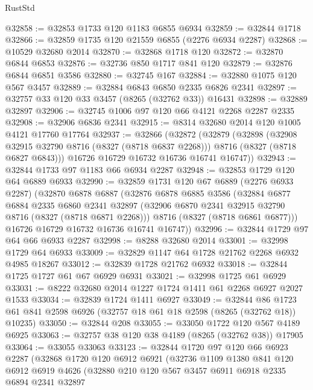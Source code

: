 \begin{lexlean}{RustStd}
\begin{coremodule}
{\begin{coremodule}
{{{{{{{{{{{{{{{{{{{{{{{{{{{{{{{{{{{{{{{{{{{{{{{{{{{{{{@32858 := @32853 @1733 @120 @1183 @6855 @6934
@32859 := @32844 @1718
@32866 := @32859 @1735 @120 @21559 @6855 (@2276 @6934 @2287)
@32868 := @10529 @32680 @2014
@32870 := @32868 @1718 @120
@32872 := @32870 @6844 @6853
@32876 := @32736 @850 @1717 @841 @120
@32879 := @32876 @6844 @6851 @3586
@32880 := @32745 @167
@32884 := @32880 @1075 @120 @567 @3457
@32889 := @32884 @6843 @6850 @2335 @6826 @2341
@32897 := @32757 @33 @120 @33 @3457 (@8265 (@32762 @33)) @16431
@32898 := @32889 @32897
@32906 := @32745 @1006 @97 @120 @66 @4121 @2268 @2287 @2335
@32908 := @32906 @6836 @2341
@32915 := @8314 @32680 @2014 @120 @1005 @4121 @17760 @17764
@32937 := @32866
    (@32872
      (@32879
        (@32898
          (@32908 @32915 @32790 @8716 (@8327 (@8718 @6837 @2268)))
          @8716
          (@8327 (@8718 @6827 @6843)))
        @16726
        @16729
        @16732
        @16736
        @16741
        @16747))
@32943 := @32844 @1733 @97 @1183 @66 @6934 @2287
@32948 := @32853 @1729 @120 @64 @6889 @6933
@32990 := @32859
    @1731
    @120
    @67
    @6889
    (@2276 @6933 @2287)
    (@32870
      @6878
      @6887
      (@32876
        @6878
        @6885
        @3586
        (@32884
          @6877
          @6884
          @2335
          @6860
          @2341
          @32897
          (@32906 @6870 @2341 @32915 @32790 @8716 (@8327 (@8718 @6871 @2268)))
          @8716
          (@8327 (@8718 @6861 @6877)))
        @16726
        @16729
        @16732
        @16736
        @16741
        @16747))
@32996 := @32844 @1729 @97 @64 @66 @6933 @2287
@32998 := @8288 @32680 @2014
@33001 := @32998 @1729 @64 @6933
@33009 := @32829 @1147 @64 @1728 @21762 @2268 @6932 @4985 @18267
@33012 := @32839 @1728 @21762 @6932
@33018 := @32844 @1725 @1727 @61 @67 @6929 @6931
@33021 := @32998 @1725 @61 @6929
@33031 := @8222 @32680 @2014 @1227 @1724 @1411 @61 @2268 @6927 @2027 @1533
@33034 := @32839 @1724 @1411 @6927
@33049 := @32844
    @86
    @1723
    @61
    @841
    @2598
    @6926
    (@32757 @18 @61 @18 @2598 (@8265 (@32762 @18)) @10235)
@33050 := @32844 @208
@33055 := @33050 @1722 @120 @567 @4189 @6925
@33063 := @32757 @38 @120 @38 @4189 (@8265 (@32762 @38)) @17905
@33064 := @33055 @33063
@33123 := @32844
    @1720
    @97
    @120
    @66
    @6923
    @2287
    (@32868
      @1720
      @120
      @6912
      @6921
      (@32736
        @1109
        @1380
        @841
        @120
        @6912
        @6919
        @4626
        (@32880
          @210
          @120
          @567
          @3457
          @6911
          @6918
          @2335
          @6894
          @2341
          @32897
}}}}}}}}}}}}}}}}}}}}}}}}}}}}}}}}}}}}}}}}}}}}}}}}}}}}}}
\end{coremodule}}
\end{coremodule}
\end{lexlean}
